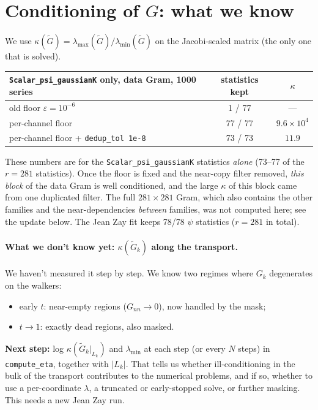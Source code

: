 \documentclass[11pt]{article}
\newcommand{\code}[1]{\texttt{#1}}
\newcommand{\Gt}{\widetilde{G}}
\begin{document}
\section{Conditioning of $G$: what we know}

We use $\kappa(\Gt) = \lambda_{\max}(\Gt)/\lambda_{\min}(\Gt)$ on the Jacobi-scaled matrix
(the only one that is solved).

\begin{center}
\begin{tabular}{lcc}
\toprule
\code{Scalar\_psi\_gaussianK} only, data Gram, 1000 series & statistics kept & $\kappa$\\
\midrule
old floor $\varepsilon=10^{-6}$ & 1 / 77 & --- \\
per-channel floor & 77 / 77 & $9.6\times10^{4}$\\
per-channel floor + \code{dedup\_tol 1e-8} & 73 / 73 & $11.9$\\
\bottomrule
\end{tabular}
\end{center}

\noindent These numbers are for the \code{Scalar\_psi\_gaussianK} statistics \emph{alone}
(73--77 of the $r=281$ statistics). Once the floor is fixed and the near-copy filter removed,
\emph{this block} of the data Gram is well conditioned, and the large $\kappa$ of this block came
from one duplicated filter. The full $281\times281$ Gram, which also contains the other families and
the near-dependencies \emph{between} families, was not computed here; see the update below.
The Jean Zay fit keeps 78/78 $\psi$ statistics ($r=281$ in total).

\paragraph{What we don't know yet: $\kappa(\Gt_k)$ along the transport.} We haven't
measured it step by step. We know two regimes where $G_k$ degenerates on the walkers:
\begin{itemize}
  \item early $t$: near-empty regions ($G_{nn}\to 0$), now handled by the mask;
  \item $t\to1$: exactly dead regions, also masked.
\end{itemize}
\textbf{Next step:} log $\kappa(\Gt_k|_{L_k})$ and $\lambda_{\min}$ at each step (or every
$N$ steps) in \code{compute\_eta}, together with $|L_k|$. That tells us whether
ill-conditioning in the bulk of the transport contributes to the numerical problems, and
if so, whether to use a per-coordinate $\lambda$, a truncated or early-stopped solve, or
further masking. This needs a new Jean Zay run.
\end{document}
